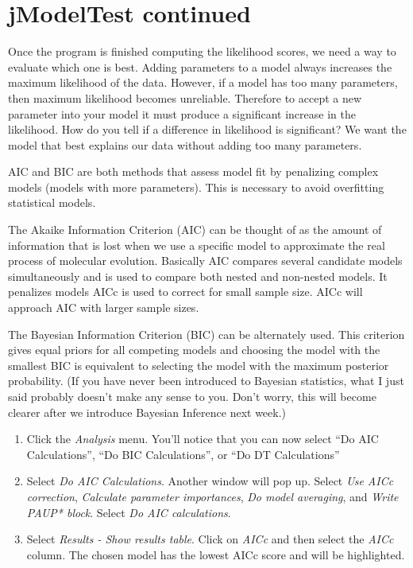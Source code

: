 \documentclass[11pt]{article}
\begin{document}
\section{jModelTest continued}


Once the program is finished computing the likelihood scores, we need a way to evaluate which one is best.  Adding parameters to a model always increases the maximum likelihood of the data.  However, if a model has too many parameters, then maximum likelihood becomes unreliable.  Therefore to accept a new parameter into your model it must produce a significant increase in the likelihood.  How do you tell if a difference in likelihood is significant?  We want the model that best explains our data without adding too many parameters.

AIC and BIC are both methods that assess model fit by penalizing complex models (models with more parameters).
This is necessary to avoid overfitting statistical models.

The Akaike Information Criterion (AIC) can be thought of as the amount of information that is lost when we use 
a specific model to approximate the real process of molecular evolution.  
Basically AIC compares several candidate models simultaneously and is used to compare both nested and non-nested models.  
It penalizes models 
AICc is used to correct for small sample size.  AICc will approach AIC with larger sample sizes.

The Bayesian Information Criterion (BIC) can be alternately used.  
This criterion gives equal priors for all competing models and choosing the model with the smallest 
BIC is equivalent to selecting the model with the maximum posterior probability. 
(If you have never been introduced to Bayesian statistics, what I just said probably doesn’t make any sense to you.  
Don’t worry, this will become clearer after we introduce Bayesian Inference next week.)

\begin{enumerate}

\item Click the \textit{Analysis} menu.  You’ll notice that you can now select ``Do AIC Calculations'', ``Do BIC Calculations'', or ``Do DT Calculations''

\item Select \textit{Do AIC Calculations}.  Another window will pop up.  Select \textit{Use AICc correction}, \textit{Calculate parameter importances}, 
        \textit{Do model averaging}, and \textit{Write PAUP* block}.  Select \textit{Do AIC calculations}.
\item Select \textit{Results - Show results table}.  Click on \textit{AICc} and then select the \textit{AICc} column.  
The chosen model has the lowest AICc score and will be highlighted.

\end{enumerate}
\end{document}
